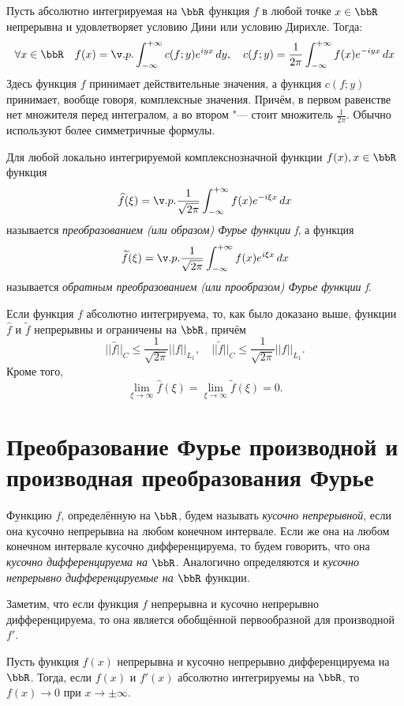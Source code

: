 Пусть абсолютно интегрируемая на $\bbR$ функция $f$ в любой точке $x \in \bbR$ непрерывна и удовлетворяет условию Дини или условию Дирихле. Тогда:
$$
\forall x \in \bbR\quad f(x) = \v.p.\int_{-\infty}^{+\infty} c(f;y)e^{iyx}\,dy,\quad c(f;y)=\frac{1}{2\pi}\int_{-\infty}^{+\infty} f(x)e^{-iyx}\,dx
$$
Здесь функция $f$ принимает действительные значения, а функция $c(f;y)$ принимает, вообще говоря, комплексные значения. Причём, в первом равенстве нет множителя перед интегралом, а во втором "--- стоит множитель $\frac{1}{2\pi}$. Обычно используют более симметричные формулы.
\begin{defn}
Для любой локально интегрируемой комплекснозначной функции $f(x), x \in \bbR$ функция
$$
\widehat{f}(\xi) = \v.p.\frac{1}{\sqrt{2\pi}} \int_{-\infty}^{+\infty} f(x)e^{-i\xi x}\,dx
$$
называется \textit{преобразованием (или образом) Фурье функции f}, а функция
$$
\widetilde{f}(\xi) = \v.p.\frac{1}{\sqrt{2\pi}} \int_{-\infty}^{+\infty} f(x)e^{i\xi x}\,dx
$$
называется \textit{обратным преобразованием (или прообразом) Фурье функции f}.
\end{defn}
Если функция $f$ абсолютно интегрируема, то, как было доказано выше, функции $\widehat{f}$ и $\widetilde{f}$ непрерывны и ограничены на $\bbR$, причём
$$
||\widehat{f}||_C \le \frac{1}{\sqrt{2\pi}}||f||_{L_1}, \quad ||\widetilde{f}||_C \le \frac{1}{\sqrt{2\pi}}||f||_{L_1}.
$$
Кроме того,
$$
\lim_{\xi \to \infty} \widehat{f}(\xi) = \lim_{\xi \to \infty} \widetilde{f}(\xi) = 0.
$$

\section{Преобразование Фурье производной и производная преобразования Фурье}

Функцию $f$, определённую на $\bbR$, будем называть \textit{кусочно непрерывной}, если она кусочно непрерывна на любом конечном интервале. Если же она на любом конечном интервале кусочно дифференцируема, то будем говорить, что она \textit{кусочно дифференцируема на $\bbR$}. Аналогично определяются и \textit{кусочно непрерывно дифференцируемые на $\bbR$} функции. 

Заметим, что если функция $f$ непрерывна и кусочно непрерывно дифференцируема, то она является обобщённой первообразной для производной~$f'$.

\begin{lemm}
Пусть функция $f(x)$ непрерывна и кусочно непрерывно дифференцируема на $\bbR$. Тогда, если $f(x)$ и $f'(x)$ абсолютно интегрируемы на $\bbR$, то $f(x)\to 0$ при $x\to\pm\infty$.
\end{lemm}

